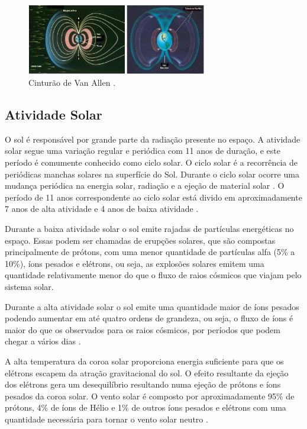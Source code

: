 \begin{figure}
	\centering
	\includegraphics[width=0.7\textwidth]{figuras/cinturao.jpg}
	\caption[Cinturão de Van Allen]{Cinturão de Van Allen \cite{cinturao}.}
	\label{Img:cinturaoVanAllen}	
\end{figure}

\subsection{Atividade Solar}

O sol é responsável por grande parte da radiação presente no espaço. A atividade solar segue uma variação regular e periódica com 11 anos de duração, e este período é comumente conhecido como ciclo solar. O ciclo solar é a recorrência de periódicas manchas solares na superfície do Sol. Durante o ciclo solar ocorre uma mudança periódica na energia solar, radiação e a ejeção de material solar \cite{Mansoori:2013}. O período de 11 anos correspondente ao ciclo solar está divido em aproximadamente 7 anos de alta atividade e 4 anos de baixa atividade \cite{Boudenot:2007}. 

Durante a baixa atividade solar o sol emite rajadas de partículas energéticas no espaço. Essas podem ser chamadas de erupções solares, que são compostas principalmente de prótons, com uma menor quantidade de partículas alfa (5\% a 10\%), íons pesados e elétrons, ou seja, as explosões solares emitem uma quantidade relativamente menor do que o fluxo de raios cósmicos que viajam pelo sistema solar.

Durante a alta atividade solar o sol emite uma quantidade maior de íons pesados podendo aumentar em até quatro ordens de grandeza, ou seja, o fluxo de íons é maior do que os observados para os raios cósmicos, por períodos que podem chegar a vários dias \cite{Stassinopoulos:1988}. 

A alta temperatura da coroa solar proporciona energia suficiente para que os elétrons escapem da atração gravitacional do sol. O efeito resultante da ejeção dos elétrons gera um desequilíbrio resultando numa ejeção de prótons e íons pesados da coroa solar. O vento solar é composto por aproximadamente 95\% de prótons, 4\% de íons de Hélio e 1\% de outros íons pesados e elétrons com uma quantidade necessária para tornar o vento solar neutro \cite{Velazco:2007}. 



